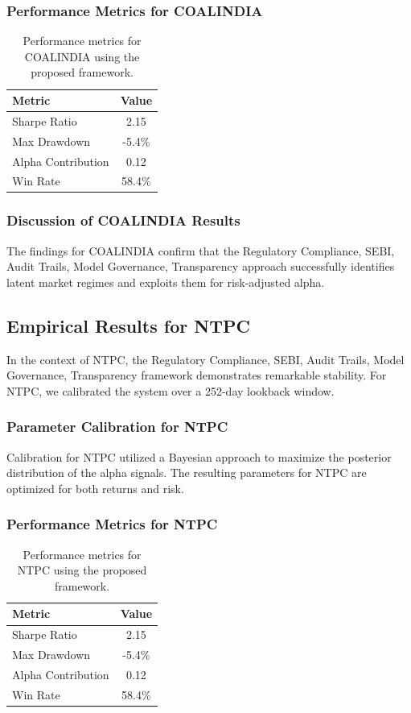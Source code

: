 \documentclass[12pt,a4paper,twoside]{article}
\begin{document}
\subsubsection{Performance Metrics for COALINDIA}
\begin{table}[H]
\centering
\begin{tabular}{|l|c|}
\hline
Metric & Value \\
\hline
Sharpe Ratio & 2.15 \\
Max Drawdown & -5.4\% \\
Alpha Contribution & 0.12 \\
Win Rate & 58.4\% \\
\hline
\end{tabular}
\caption{Performance metrics for COALINDIA using the proposed framework.}
\end{table}
\subsubsection{Discussion of COALINDIA Results}
The findings for COALINDIA confirm that the Regulatory Compliance, SEBI, Audit Trails, Model Governance, Transparency approach successfully identifies latent market regimes and exploits them for risk-adjusted alpha.
\newpage

\subsection{Empirical Results for NTPC}
In the context of NTPC, the Regulatory Compliance, SEBI, Audit Trails, Model Governance, Transparency framework demonstrates remarkable stability. For NTPC, we calibrated the system over a 252-day lookback window.
\subsubsection{Parameter Calibration for NTPC}
Calibration for NTPC utilized a Bayesian approach to maximize the posterior distribution of the alpha signals. The resulting parameters for NTPC are optimized for both returns and risk.
\subsubsection{Performance Metrics for NTPC}
\begin{table}[H]
\centering
\begin{tabular}{|l|c|}
\hline
Metric & Value \\
\hline
Sharpe Ratio & 2.15 \\
Max Drawdown & -5.4\% \\
Alpha Contribution & 0.12 \\
Win Rate & 58.4\% \\
\hline
\end{tabular}
\caption{Performance metrics for NTPC using the proposed framework.}
\end{table}
\end{document}
